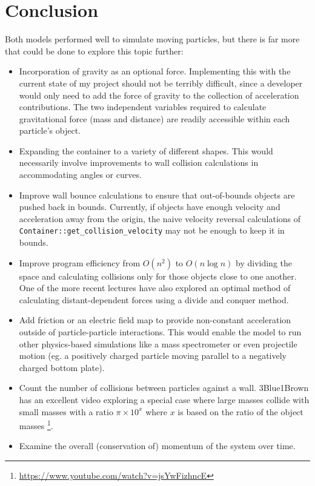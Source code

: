 \documentclass{article}
\begin{document}
\section{Conclusion}
Both models performed well to simulate moving particles,
but there is far more that could be done to explore this topic further:
\begin{itemize}
    \item Incorporation of gravity as an optional force.
    Implementing this with the current state of my project should not be terribly difficult,
    since a developer would only need to add the force of gravity to the collection of acceleration contributions.
    The two independent variables required to calculate gravitational force (mass and distance) are readily accessible within each particle's object.
    \item Expanding the container to a variety of different shapes.
    This would necessarily involve improvements to wall collision calculations in accommodating angles or curves.
    \item Improve wall bounce calculations to ensure that out-of-bounds objects are pushed back in bounds.
    Currently, if objects have enough velocity and acceleration away from the origin, the naive velocity reversal
    calculations of \texttt{Container::get\_collision\_velocity} may not be enough to keep it in bounds.
    \item Improve program efficiency from $O(n^2)$ to $O(n\log{n})$ by dividing the space
    and calculating collisions only for those objects close to one another.
    One of the more recent lectures have also explored an optimal
    method of calculating distant-dependent forces using a divide and conquer method.
    \item Add friction or an electric field map to provide non-constant acceleration outside of particle-particle interactions.
    This would enable the model to run other physics-based simulations like a mass spectrometer or even projectile motion
    (eg. a positively charged particle moving parallel to a negatively charged bottom plate).
    \item Count the number of collisions between particles against a wall.
    3Blue1Brown has an excellent video exploring a special case where large
    masses collide with small masses with a ratio $\pi\times 10^x$ where $x$ is based on the ratio of the object masses
    \footnote{\url{https://www.youtube.com/watch?v=jsYwFizhncE}}.
    \item Examine the overall (conservation of) momentum of the system over time.

\end{itemize}
\end{document}
